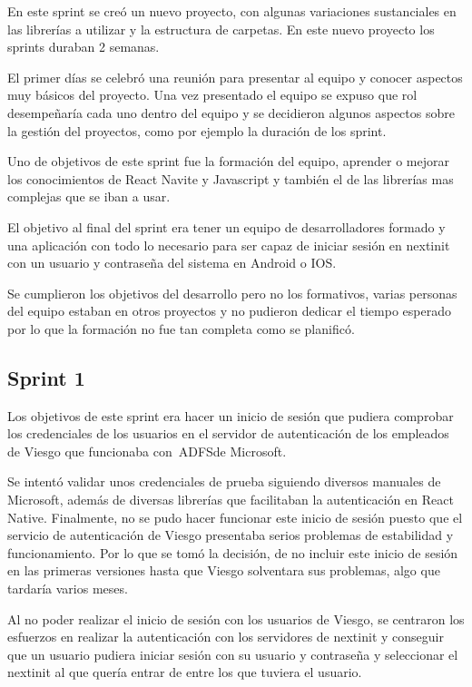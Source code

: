 En este sprint se creó un nuevo proyecto, con algunas variaciones sustanciales en las librerías a 
utilizar y la estructura de carpetas. En este nuevo proyecto los sprints duraban 2 semanas. 

El primer 
días se celebró una reunión para presentar al equipo y conocer aspectos muy básicos del proyecto. Una 
vez presentado el equipo se expuso que rol desempeñaría cada uno dentro del equipo y se decidieron 
algunos aspectos sobre la gestión del proyectos, como por ejemplo la duración de los sprint.

Uno de objetivos de este sprint fue la formación del equipo, aprender o mejorar los conocimientos de 
React Navite y Javascript y también el de las librerías mas complejas que se iban a usar.

El objetivo al final del sprint era tener un equipo de desarrolladores formado y una aplicación 
con todo lo necesario para ser 
capaz de iniciar sesión en nextinit con un usuario y contraseña del sistema en Android o IOS.

Se cumplieron los objetivos del desarrollo pero no los formativos, varias personas del equipo estaban 
en otros proyectos y no pudieron dedicar el tiempo esperado por lo que la formación no fue tan completa 
como se planificó.

\subsection{Sprint 1}

Los objetivos de este sprint era hacer un inicio de sesión que pudiera comprobar los credenciales de los
usuarios en el servidor de autenticación de los empleados de Viesgo que funcionaba con~\acf{ADFS}de Microsoft.

Se intentó validar unos credenciales de prueba siguiendo diversos manuales de Microsoft, además de 
diversas librerías que facilitaban la autenticación en React Native. Finalmente, no se pudo hacer funcionar
 este inicio de sesión puesto que el servicio de autenticación de Viesgo presentaba serios problemas de
 estabilidad y funcionamiento. Por lo que se tomó la decisión, de no incluir este inicio de sesión en las 
 primeras versiones hasta que Viesgo solventara sus problemas, algo que tardaría varios meses.

Al no poder realizar el inicio de sesión con los usuarios de Viesgo, se centraron los esfuerzos en realizar
la autenticación con los servidores de nextinit y conseguir que un usuario pudiera iniciar sesión con su 
usuario y contraseña y seleccionar el nextinit al que quería entrar de entre los que tuviera el usuario.

